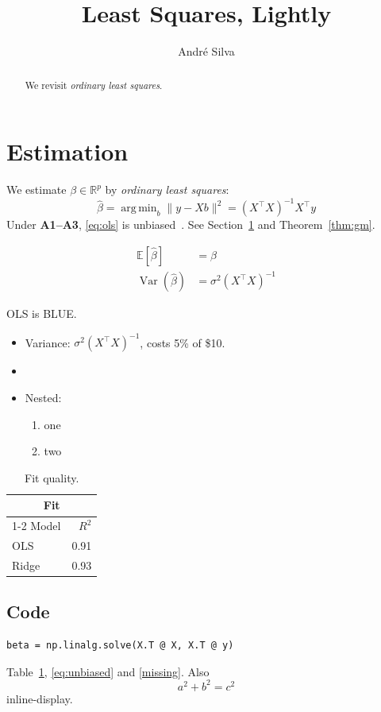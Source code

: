 \documentclass{article}
\title{Least Squares, Lightly}
\author{Andr\'e Silva}
\newcommand{\R}{\mathbb{R}}
\DeclareMathOperator*{\argmin}{arg\,min}
\begin{document}
\maketitle

\begin{abstract}
We revisit \emph{ordinary least squares}.
\end{abstract}

\section{Estimation}
\label{sec:est}
We estimate $\beta \in \R^p$ by
\emph{ordinary least squares}:
\begin{equation}
  \hat\beta = \argmin_b \|y - Xb\|^2 = (X^\top X)^{-1} X^\top y
  \label{eq:ols}
\end{equation}
Under \textbf{A1--A3}, \eqref{eq:ols} is unbiased~\cite{greene2012, hayashi}.
See Section~\ref{sec:est} and Theorem~\ref{thm:gm}.

\begin{align}
  \mathbb{E}[\hat\beta] &= \beta \label{eq:unbiased} \\
  \operatorname{Var}(\hat\beta) &= \sigma^2 (X^\top X)^{-1} \nonumber
\end{align}

\begin{theorem}\label{thm:gm}
OLS is BLUE.
\end{theorem}

\begin{itemize}
  \item Variance: $\sigma^2 (X^\top X)^{-1}$, costs 5\% of \$10.
  \item {}
  \item Nested:
    \begin{enumerate}
      \item one
      \item two
    \end{enumerate}
\end{itemize}

\begin{table}[h]
\centering
\begin{tabular}{lr}
\toprule
\multicolumn{2}{c}{Fit} \\
\cmidrule(lr){1-2}
Model & $R^2$ \\
\midrule
OLS & 0.91 \\[2pt]
Ridge & 0.93 \\
\bottomrule
\end{tabular}
\caption{Fit quality.}\label{tab:fit}
\end{table}

\subsection{Code}
\begin{verbatim}
beta = np.linalg.solve(X.T @ X, X.T @ y)
\end{verbatim}
Table~\ref{tab:fit}, \eqref{eq:unbiased} and \ref{missing}. Also \[ a^2 + b^2 = c^2 \] inline-display.
\end{document}

